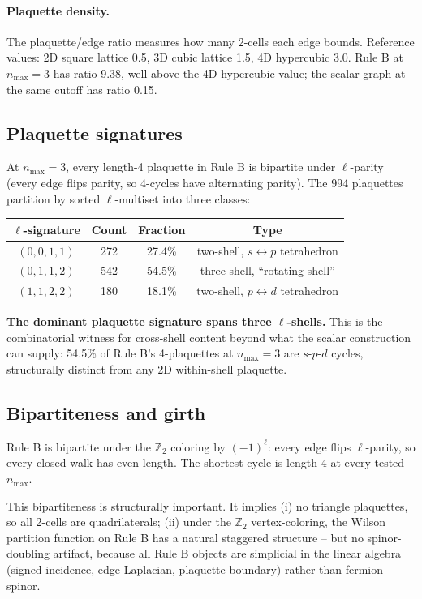 \documentclass[11pt]{article}
\begin{document}
\paragraph{Plaquette density.} The plaquette/edge ratio measures how many 2-cells
each edge bounds. Reference values: 2D square lattice 0.5, 3D cubic lattice 1.5,
4D hypercubic 3.0. Rule B at $n_\text{max}=3$ has ratio 9.38, well above the 4D
hypercubic value; the scalar graph at the same cutoff has ratio 0.15.

\subsection{Plaquette signatures}
\label{sec:plaquette_signatures}

At $n_\text{max}=3$, every length-4 plaquette in Rule B is bipartite under
$\ell$-parity (every edge flips parity, so 4-cycles have alternating parity).
The 994 plaquettes partition by sorted $\ell$-multiset into three classes:
\begin{center}
\begin{tabular}{cccc}
\toprule
$\ell$-signature & Count & Fraction & Type \\
\midrule
$(0,0,1,1)$ & 272 & 27.4\% & two-shell, $s\leftrightarrow p$ tetrahedron \\
$(0,1,1,2)$ & 542 & 54.5\% & three-shell, ``rotating-shell'' \\
$(1,1,2,2)$ & 180 & 18.1\% & two-shell, $p\leftrightarrow d$ tetrahedron \\
\bottomrule
\end{tabular}
\end{center}

\textbf{The dominant plaquette signature spans three $\ell$-shells.} This is the
combinatorial witness for cross-shell content beyond what the scalar
construction can supply: 54.5\% of Rule B's 4-plaquettes at $n_\text{max}=3$ are
$s$-$p$-$d$ cycles, structurally distinct from any 2D within-shell plaquette.

\subsection{Bipartiteness and girth}

Rule B is bipartite under the $\mathbb{Z}_2$ coloring by $(-1)^\ell$: every edge
flips $\ell$-parity, so every closed walk has even length. The shortest cycle is
length 4 at every tested $n_\text{max}$.

This bipartiteness is structurally important. It implies (i) no triangle plaquettes,
so all 2-cells are quadrilaterals; (ii) under the $\mathbb{Z}_2$ vertex-coloring,
the Wilson partition function on Rule B has a natural staggered structure -- but
no spinor-doubling artifact, because all Rule B objects are simplicial in the
linear algebra (signed incidence, edge Laplacian, plaquette boundary) rather than
fermion-spinor.
\end{document}
